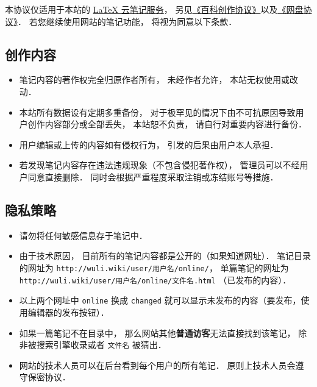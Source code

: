 
本协议仅适用于本站的 \href{http://example.com}{LaTeX 云笔记服务}， 另见\href{http://wuli.wiki/online/licens.html}{《百科创作协议》}以及\href{http://www.example.com}{《网盘协议》}． 若您继续使用网站的笔记功能， 将视为同意以下条款．

\subsection{创作内容}
\begin{itemize}
\item 笔记内容的著作权完全归原作者所有， 未经作者允许， 本站无权使用或改动．
\item 本站所有数据设有定期多重备份， 对于极罕见的情况下由不可抗原因导致用户创作内容部分或全部丢失， 本站恕不负责， 请自行对重要内容进行备份．
\item 用户编辑或上传的内容如有侵权行为， 引发的后果由用户本人承担．
\item 若发现笔记内容存在违法违规现象（不包含侵犯著作权）， 管理员可以不经用户同意直接删除． 同时会根据严重程度采取注销或冻结账号等措施．
\end{itemize}

\subsection{隐私策略}
\begin{itemize}
\item 请勿将任何敏感信息存于笔记中．
\item 由于技术原因， 目前所有的笔记内容都是公开的（如果知道网址）． 笔记目录的网址为 \verb|http://wuli.wiki/user/用户名/online/|， 单篇笔记的网址为 \verb|http://wuli.wiki/user/用户名/online/文件名.html| （已发布的内容）．
\item 以上两个网址中 \verb|online| 换成 \verb|changed| 就可以显示未发布的内容（要发布，使用编辑器的发布按钮）．
\item 如果一篇笔记不在目录中， 那么网站其他\textbf{普通访客}无法直接找到该笔记， 除非被搜索引擎收录或者 \verb|文件名| 被猜出．
\item 网站的技术人员可以在后台看到每个用户的所有笔记． 原则上技术人员会遵守保密协议．
\end{itemize}
